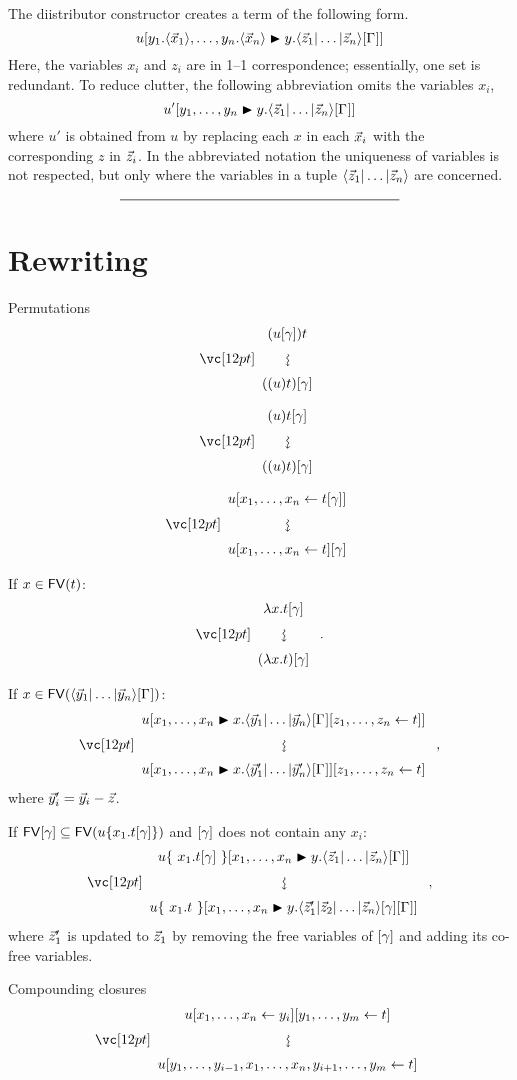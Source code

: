 \documentclass{amsart}
\begin{document}


The diistributor constructor creates a term of the following form.
\[
	u\diistr*{y_1.\tup*{\vv*x_1},\ldots,y_n.\tup*{\vv*x_n}}y{\ttup*z\G}
\]
Here, the variables $x_i$ and $z_i$ are in 1--1 correspondence; essentially, one set is redundant.
%
To reduce clutter, the following abbreviation omits the variables $x_i$,
\[
	u'\diistr yy{\ttup*z\G}
\]
where $u'$ is obtained from $u$ by replacing each $x$ in each $\vv*x_i$ with the corresponding $z$ in $\vv*z_i$.
%
In the abbreviated notation the uniqueness of variables is not respected, but only where the variables in a tuple $\ttup*z$ are concerned.


\[
	\rule{200pt}{.5pt}
\]


\section*{Rewriting}

\noindent
Permutations
\[
\displayrewrite
{ (u\g)t }
{ ((u)t)\g }
\]

\bigskip

\[
\displayrewrite
{ (u)t\g }
{ ((u)t)\g }
\]

\[
\displayrewrite
{ u\share x{t\g} }
{ u\share xt\g }
\]

If $x\in{\mathop{\mathsf{FV}}}(t)$:
\[
\displayrewrite
{ \lambda x. t\g }
{ (\lambda x. t) \g }\;.
\]

\noindent
If $x\in\FV(\ttup*y\G)$:
\[
\displayrewrite
  { u\diistr xx{\ttup*y\G\share zt} }
  { u\diistr xx{\ttup{\vv*y'}\G}\share zt }\;,
\]
where $\vv*y'_i=\vv*y_i-\vv*z$.

\bigskip

\noindent
If $\FV\g\subseteq\FV(u\cxt*{x_1.t\g})$ and $\g$ does not contain any $x_i$:
\[
\displayrewrite
  { u\cxt*{~x_1.t\g~}\diistr xy{\ttup*z\G} }
  { u\cxt*{~x_1.t~}\diistr xy{\tup*{\vv*z'_1|\vv*z_2|\dotso|\vv*z_n}\g\G} }\;,
\]
where $\vv*z'_1$ is updated to $\vv*z_1$ by removing the free variables of $\g$
and adding its co-free variables.

\bigskip
\bigskip
\bigskip

\noindent
Compounding closures
\[
\displayrewrite
{ u\share x{y_i}\share[m] yt }
{ u\share* {y_1, \dotsc, y_{i-1}, \vv x, y_{i+1}, \dotsc, y_m}t }
\]

\bigskip
\end{document}
